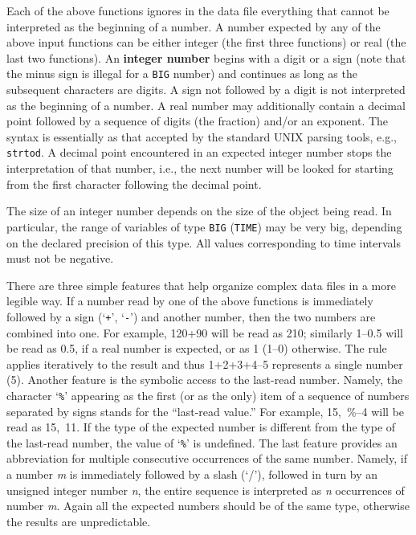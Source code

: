 Each of the above functions ignores in the data file everything that
cannot be interpreted as the beginning of a number.
A number expected by any of the above input functions can be either integer
(the first three functions) or real (the last two functions).
An {\bf integer number} begins with a digit or a sign
(note that the minus sign is illegal for a {\tt BIG} number)
and continues as long as the subsequent characters are digits.
A sign not followed by a digit is not interpreted as the beginning of a number.
A real number may additionally contain a decimal
point followed by a sequence of digits (the fraction)
and/or an exponent.
The syntax is essentially as that accepted by the standard UNIX parsing
tools, e.g., {\tt strtod}.
A decimal point encountered in an expected integer number
stops the interpretation
of that number, i.e., the next number will be looked for starting from the first
character following the decimal point.

The size of an integer number depends on the size of the
object being read.
In particular, the range of variables of type
{\tt BIG} ({\tt TIME}) may be very big,
depending on the declared precision of this type.
All values corresponding to time intervals must not be negative.

There are three simple features that help organize complex
data files in a more legible way.
If a number read by one of the above functions is immediately
followed by a sign (`{\tt +}', `{\tt -}')
and another number, then the two numbers are
combined into one. For example, 120+90 will be read as 210; similarly
1--0.5 will be read as 0.5, if a real number is expected, or as 1 (1--0)
otherwise. The rule applies iteratively to the result and thus 1+2+3+4--5
represents a single number (5). Another feature is the symbolic access to
the last-read number. Namely, the character `{\tt \%}'
appearing as the first (or as the
only) item of a sequence of numbers separated by signs stands for
the ``last-read value.''
For example, 15,~\%--4 will be read as 15,~11.
If the type of the expected number
is different from the type of the last-read number, the value of `{\tt \%}' is
undefined.
The last feature provides an
abbreviation for multiple consecutive occurrences of the same number.
Namely, if a number {\em m\/}
is immediately followed by a slash (`/'), followed in
turn by an unsigned integer number {\em n}, the entire sequence is interpreted as
{\em n\/} occurrences of number {\em m}.
Again all the expected numbers should be of the
same type, otherwise the results are unpredictable.

